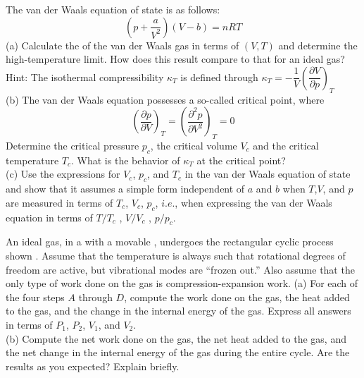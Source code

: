    \begin{example}
        The van der Waals equation of state is as follows:
        \begin{equation*}
        	(p+\frac{a}{V^{2}})(V-b)=nRT
        \end{equation*}
        (a) Calculate the  of the van der Waals gas in terms of $(V,T)$ and
        determine the high-temperature limit. How does this result compare to that for an ideal gas?\\
        Hint: The isothermal compressibility $\kappa_T$ is defined through $\kappa_{T}=-\dfrac{1}{V}\left(\dfrac{\partial V}{\partial p}\right)_{T}$\\
        (b) The van der Waals equation possesses a so-called critical point, where
        \begin{equation*}
        	\left(\frac{\partial p}{\partial V}\right)_{T} = \left(\frac{\partial^{2} p}{\partial V^{2}}\right)_{T} = 0
        \end{equation*}
        Determine the critical pressure $p_c$, the critical volume $V_c$ and the critical temperature $T_c$. What
        is the behavior of $\kappa_T$ at the critical point?\\
        (c) Use the expressions for $V_c$, $p_c$, and $T_c$ in the van der Waals equation of state and show that it
        assumes a simple form independent of $a$ and $b$ when $T$,$V$, and $p$ are measured in terms of $T_c$,
        $V_c$, $p_c$, $i.e.$, when expressing the van der Waals equation in terms of $T/T_c$ , $V/V_c$ , $p/p_c$.
    \end{example}
    \begin{example}
        An ideal  gas, in a  with a movable , undergoes the rectangular cyclic process shown
        . Assume that the temperature is always such
        that rotational degrees of freedom are active, but vibrational modes are “frozen out.” Also assume that the only
        type of work done on the gas is  compression-expansion work.
        (a) For each of the four steps $A$ through $D$, compute the work done on the gas, the heat added to
        the gas, and the change in the internal energy of the gas.
        Express all answers in terms of $P_1$, $P_2$, $V_1$, and $V_2$. \\
        (b) Compute the net work done on the gas, the net
        heat added to the gas, and the net change in the internal
        energy of the gas during the entire cycle. Are the results
        as you expected? Explain briefly.
    \end{example}
